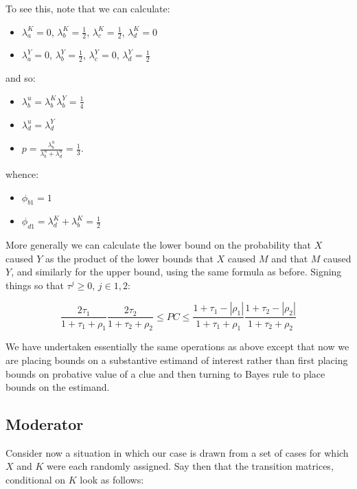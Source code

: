 \documentclass[
  12pt,
]{book}
\providecommand{\tightlist}{%
  \setlength{\itemsep}{0pt}\setlength{\parskip}{0pt}}
\begin{document}
To see this, note that we can calculate:

\begin{itemize}
\tightlist
\item
  \(\lambda_a^K =0\), \(\lambda_b^K = \frac{1}{2}\), \(\lambda_c^K = \frac{1}{2}\), \(\lambda_d^K = 0\)
\item
  \(\lambda_a^Y =0\), \(\lambda_b^Y=\frac{1}{2}\), \(\lambda_c^Y=0\), \(\lambda_d^Y=\frac{1}{2}\)
\end{itemize}

and so:

\begin{itemize}
\tightlist
\item
  \(\lambda_b^u = \lambda_b^K\lambda_b^Y = \frac{1}4\)
\item
  \(\lambda_d^u = \lambda_d^Y\)
\item
  \(p = \frac{\lambda_b^u}{\lambda_b^u + \lambda_d^u} = \frac{1}3\).
\end{itemize}

whence:

\begin{itemize}
\tightlist
\item
  \(\phi_{b1} = 1\)
\item
  \(\phi_{d1} = \lambda_d^K + \lambda_b^K = \frac{1}{2}\)
\end{itemize}

More generally we can calculate the lower bound on the probability that \(X\) caused \(Y\) as the product of the lower bounds that \(X\) caused \(M\) and that \(M\) caused \(Y\), and similarly for the upper bound, using the same formula as before. Signing things so that \(\tau^j\geq 0\), \(j \in {1,2}\):

\[\frac{2\tau_1}{1+\tau_1+\rho_1}\frac{2\tau_2}{1+\tau_2+\rho_2}  \leq PC \leq \frac{1+\tau_1-|\rho_1|}{1+\tau_1+\rho_1}\frac{1+\tau_2-|\rho_2|}{1+\tau_2+\rho_2} \]

We have undertaken essentially the same operations as above except that now we are placing bounds on a substantive estimand of interest rather than first placing bounds on probative value of a clue and then turning to Bayes rule to place bounds on the estimand.

\hypertarget{moderator}{%
\subsection{Moderator}\label{moderator}}

Consider now a situation in which our case is drawn from a set of cases for which \(X\) and \(K\) were each randomly assigned. Say then that the transition matrices, conditional on \(K\) look as follows:
\end{document}

